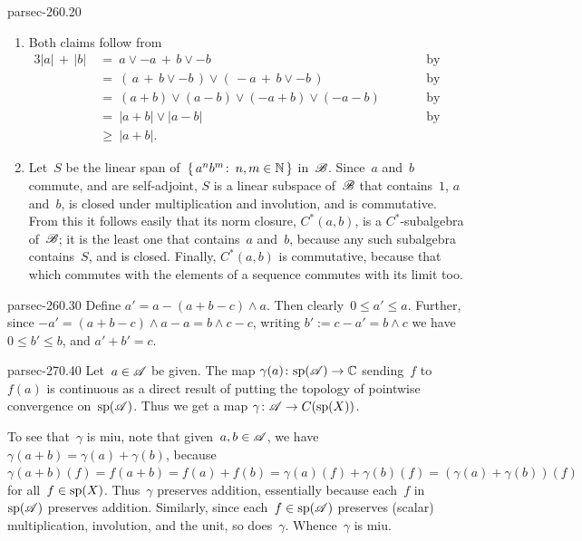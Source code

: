 \documentclass[b5page]{book}
\begin{document}
\begin{solution}{parsec-260.20}
\begin{enumerate}
As a result~$f(\left|a\right|)=\left|f(a)\right|$
for any~$\Real\scrA$ (since $\left|a\right|=\smash{\sqrt{a^2}}$,)
and thus~$f(a\vee b)=f(a)\vee f(b)$
for all~$a,b\in\Real\scrA$
(since $a\vee b=\frac{1}{2}(a+b+\left|a-b\right|)$,)
and so $f(a\wedge b)=f(a)\wedge f(b)$
for all~$a,b\in\Real\scrA$
(since~$a\wedge b = -((-a)\vee(-b))$.)
\item
Both claims follow from
\begin{alignat*}{3}
\left|a\right| \,+\, \left|b\right|
\ &= \ 
a\vee -a\,+\, b\vee -b
\qquad &&\text{by point~1} \\
\ &= \ 
(\,a\,+\,b\vee -b\,)\vee (\,-a \,+\, b\vee -b\,)
\qquad &&\text{by point~2} \\
\ &= \ 
(a+b)\vee(a-b)\vee (-a+b)\vee (-a-b)
\qquad &&\text{by point~2} \\
\ &= \ 
\left|a+b\right| \vee \left | a-b\right|
\qquad &&\text{by point~1} \\
\ &\geq \ 
\left|a+b\right|.
\end{alignat*}
\item
Let~$S$ be the linear span
of~$\{\,a^nb^m\colon\, n,m\in\mathbb{N}\,\}$ in~$\mathscr{B}$.
Since~$a$ and~$b$ commute, and are self-adjoint,
$S$ is a linear subspace of~$\mathscr{B}$
that contains~$1$, $a$ and~$b$,
is closed under multiplication and involution,
and is commutative.
From this it follows easily
that its norm closure, $C^*(a,b)$,
is a $C^*$-subalgebra of~$\mathscr{B}$;
it is the least one that contains~$a$ and~$b$,
because any such subalgebra contains~$S$, and is closed.
Finally, $C^*(a,b)$ is commutative,
because that which commutes with the elements of a sequence
commutes with its limit too.
\end{enumerate}
\end{solution}
\begin{solution}{parsec-260.30}
Define $a' = a-(a+b-c)\wedge a$.
Then clearly~$0\leq a' \leq a$.
Further, since $-a' = (a+b-c)\wedge a-a
= b\wedge c -c$,
writing $b':= c-a'=b\wedge c$ 
we have~$0\leq b'\leq b$,  and $a'+b'=c$.
\end{solution}
\begin{solution}{parsec-270.40}
Let~$a\in \mathscr{A}$ be given.
The map $\gamma(a)\colon \mathrm{sp}(\mathscr{A})\to \mathbb{C}$
sending~$f$ to~$f(a)$
is continuous as
a direct result
of putting the topology of pointwise convergence
on~$\mathrm{sp}(\mathscr{A})$.
Thus we get a map $\gamma\colon \mathscr{A}\to C(\mathrm{sp}(X))$.

To see that~$\gamma$ is miu,
note that given~$a,b\in\mathscr{A}$,
we have $\gamma(a+b)=\gamma(a)+\gamma(b)$,
because $\gamma(a+b)(f)
=f(a+b)=f(a)+f(b)=\gamma(a)(f)+\gamma(b)(f)
= (\gamma(a)+\gamma(b))(f)$ for all~$f\in \mathrm{sp}(X)$.
Thus~$\gamma$ preserves addition,
essentially because each~$f$ in~$\mathrm{sp}(\mathscr{A})$
preserves addition.
Similarly,
since each~$f\in\mathrm{sp}(\mathscr{A})$
preserves (scalar) multiplication,
involution, and the unit,
so does~$\gamma$.
Whence~$\gamma$ is miu.
\end{solution}
\end{document}
